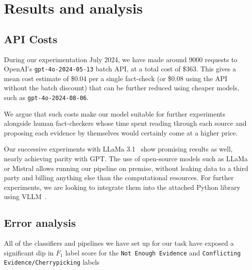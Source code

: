 
\section{Results and analysis}
\label{sec:results}

\subsection{API Costs}
During our experimentation July 2024, we have made around 9000 requests to OpenAI's \texttt{gpt-4o-2024-05-13} batch API, at a total cost of \$363.
This gives a mean cost estimate of \$0.04 per a single fact-check (or \$0.08 using the API without the batch discount) that can be further reduced using cheaper models, such as \texttt{gpt-4o-2024-08-06}.

We argue that such costs make our model suitable for further experiments alongside human fact-checkers whose time spent reading through each source and proposing each evidence by themselves would certainly come at a higher price.

Our successive experiments with LLaMa 3.1~\cite{meta2024llama31} show promising results as well, nearly achieving parity with GPT.
The use of open-source models such as LLaMa or Mistral allows running our pipeline on premise, without leaking data to a third party and billing anything else than the computational resources.
For further experiments, we are looking to integrate them into the attached Python library using VLLM~\cite{vllm}.

\subsection{Error analysis}
All of the classifiers and pipelines we have set up for our task have exposed a significant dip in $F_1$ label score for the \texttt{Not Enough Evidence} and \texttt{Conflicting Evidence/Cherrypicking} labels